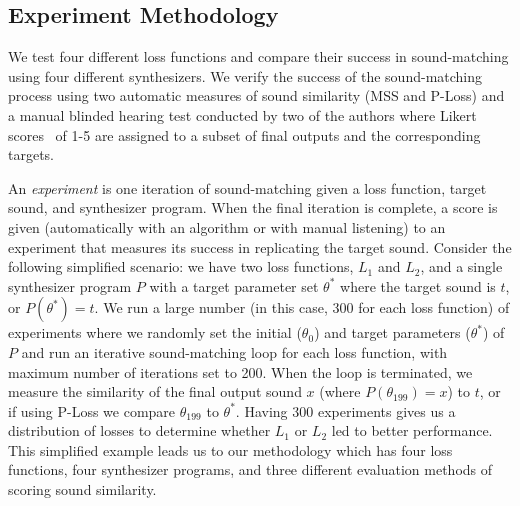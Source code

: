 \documentclass[lettersize,journal]{IEEEtran}
\newcommand{\LossSelect}{\textbf{Loss Selection}}
\newcommand{\SynthSelect}{\textbf{Synthesis Selection}}
\begin{document}

\subsection{Experiment Methodology}
\label{sec:methodology}

We test four different loss functions and compare their success in sound-matching using four different synthesizers. We verify the success of the sound-matching process using two automatic measures of sound similarity (MSS and P-Loss) and a manual blinded hearing test conducted by two of the authors where Likert scores~\cite{jebb2021review} of 1-5 are assigned to a subset of final outputs and the corresponding targets.

An \textit{experiment} is one iteration of sound-matching given a loss function, target sound,
and synthesizer program. When the final iteration is complete, a score is given (automatically with an algorithm or with manual listening) to an experiment that measures its success in replicating the target sound. Consider the following simplified scenario: we have two loss functions, $L_1$ and $L_2$, and a single synthesizer program $P$ with a target parameter set $\theta^*$ where the target sound is $t$, or $P(\theta^*) = t$. We run a large number (in this case, 300 for each loss function) of experiments where we randomly set the initial ($\theta_0$) and target parameters ($\theta^*$) of $P$ and run an iterative sound-matching loop for each loss function, with maximum number of iterations set to 200. When the loop is terminated, we measure the similarity of the final output sound $x$ (where $P(\theta_{199}) = x$) to $t$, or if using P-Loss we compare $\theta_{199}$ to $\theta^*$. Having 300 experiments gives us a distribution of losses to determine whether $L_1$ or $L_2$ led to better performance. This simplified example leads us to our methodology which has four loss functions, four synthesizer programs, and three different evaluation methods of scoring sound similarity.
\end{document}

